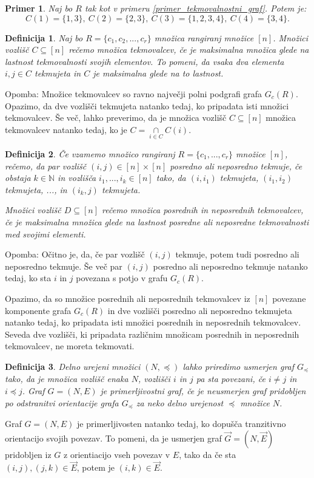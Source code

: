 \documentclass[a4paper, 12pt]{book}
\newtheorem{definicija}{Definicija}[chapter]
\newtheorem{primer}{Primer}[chapter]
\begin{document}
\begin{primer}
    Naj bo $R$ tak kot v primeru \ref{primer_tekmovalnostni_graf}. Potem je:
    \[
        C(1) = \{ 1, 3 \}, \ C(2) = \{ 2, 3 \}, \ C(3) = \{ 1, 2, 3, 4 \}, \ C(4) = \{ 3, 4 \}.
    \]
\end{primer}

\begin{definicija}
    Naj bo $R = \{ c_1, c_2, ..., c_r\}$ množica rangiranj množice $[n]$. Množici  vozlišč $C \subseteq [n]$ rečemo množica tekmovalcev, če je maksimalna množica glede na lastnost tekmovalnosti svojih elementov. To pomeni, da vsaka dva elementa $i, j \in C$ tekmujeta in $C$ je maksimalna glede na to lastnost.
\end{definicija}

Opomba: Množice tekmovalcev so ravno največji polni podgrafi grafa $G_c(R)$. Opazimo, da dve vozlišči tekmujeta natanko tedaj, ko pripadata isti množici tekmovalcev. Še več, lahko preverimo, da je množica vozlišč $C \subseteq [n]$ množica tekmovalcev natanko tedaj, ko je $C = \underset{i \in C}{\cap}C(i)$.

\begin{definicija}
    Če vzamemo množico rangiranj $R = \{ c_1, ..., c_r\}$ množice $[n]$, rečemo, da par vozlišč $(i, j) \in [n] \times [n]$ posredno ali neposredno tekmuje, če obstaja $k \in \mathbb{N}$ in vozlišča $i_1, ..., i_k \in [n]$ tako, da $(i, i_1)$ tekmujeta, $(i_1, i_2)$ tekmujeta, ..., in $(i_k, j)$ tekmujeta.

    Množici vozlišč $D \subseteq [n]$ rečemo množica posrednih in neposrednih tekmovalcev, če je maksimalna množica glede na lastnost posredne ali neposredne tekmovalnosti med svojimi elementi.
\end{definicija}

Opomba: Očitno je, da, če par vozlišč $(i, j)$ tekmuje, potem tudi posredno ali neposredno tekmuje. Še več par $(i, j)$ posredno ali neposredno tekmuje natanko tedaj, ko sta $i$ in $j$ povezana s potjo v grafu $G_c(R)$.

Opazimo, da so množice posrednih ali neposrednih tekmovalcev iz $[n]$ povezane komponente grafa $G_c(R)$ in dve vozlišči posredno ali neposredno tekmujeta natanko tedaj, ko pripadata isti množici posrednih in neposrednih tekmovalcev. Seveda dve vozlišči, ki pripadata različnim množicam posrednih in neposrednih tekmovalcev, ne moreta tekmovati.

\begin{definicija}
    Delno urejeni množici $(N, \preceq)$ lahko priredimo usmerjen graf $G_{\preceq}$ tako, da je množica vozlišč enaka $N$, vozlišči $i$ in $j$ pa sta povezani, če $i \neq j$ in $i \preceq j$.
    Graf $G = (N, E)$ je primerljivostni graf, če je neusmerjen graf pridobljen po odstranitvi orientacije grafa $G_{\preceq}$ za neko delno urejenost $\preceq$  množice $N$.
\end{definicija}
Graf $G = (N, E)$ je primerljivosten natanko tedaj, ko dopušča tranzitivno orientacijo svojih povezav. To pomeni, da je usmerjen graf $\overset{\rightarrow}{G} = (N, \overset{\rightarrow}{E})$ pridobljen iz $G$ z orientiacijo vseh povezav v $E$, tako da če sta $(i, j), (j, k) \in \overset{\rightarrow}{E}$, potem je $(i, k) \in \overset{\rightarrow}{E}$.
\end{document}
